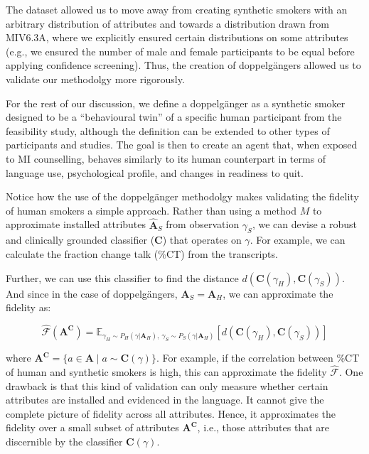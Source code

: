The dataset allowed us to move away from creating synthetic smokers with an arbitrary distribution of attributes and towards a distribution drawn from MIV6.3A, where we explicitly ensured certain distributions on some attributes (e.g., we ensured the number of male and female participants to be equal before applying confidence screening). Thus, the creation of doppelgängers allowed us to validate our methodolgy more rigorously.

For the rest of our discussion, we define a doppelgänger as a synthetic smoker designed to be a ``behavioural twin'' of a specific human participant from the feasibility study, although the definition can be extended to other types of participants and studies. The goal is then to create an agent that, when exposed to MI counselling, behaves similarly to its human counterpart in terms of language use, psychological profile, and changes in readiness to quit.

Notice how the use of the doppelgänger methodolgy makes validating the fidelity of human smokers a simple approach. Rather than using a method $M$ to approximate installed attributes $\hat{\textbf{A}}_S$ from observation $\gamma_S$, we can devise a robust and clinically grounded classifier ($\textbf{C}$) that operates on $\gamma$. For example, we can calculate the fraction change talk (\%CT) from the transcripts. 

Further, we can use this classifier to find the distance $d(\textbf{C}(\gamma_H), \textbf{C}(\gamma_S))$. And since in the case of doppelgängers, $\textbf{A}_S = \textbf{A}_H$, we can approximate the fidelity as:

$$\hat{\mathcal{F}}(\textbf{A}^\textbf{C}) = \mathbb{E}_{\gamma_H \sim P_H (\gamma | \textbf{A}_H),  \:  \gamma_S \sim P_S(\gamma | \textbf{A}_H)}[d(
\textbf{C}(\gamma_H),\textbf{C}(\gamma_S)
)]$$


where $\textbf{A}^\textbf{C} = \{a \in \textbf{A} \mid a \sim \textbf{C}(\gamma)\}$. For example, if the correlation between \%CT of human and synthetic smokers is high, this can approximate the fidelity $\hat{\mathcal{F}}$. One drawback is that this kind of validation can only measure whether certain attributes are installed and evidenced in the language. It cannot give the complete picture of fidelity across all attributes. Hence, it approximates the fidelity over a small subset of attributes $\textbf{A}^\textbf{C}$, i.e., those attributes that are discernible by the classifier $\textbf{C}(\gamma)$.



